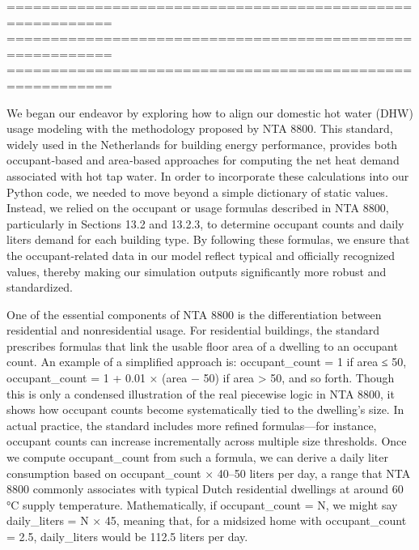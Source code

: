 ==========================================================
==========================================================
==========================================================

We began our endeavor by exploring how to align our domestic hot water (DHW) usage modeling with the methodology proposed by NTA 8800. This standard, widely used in the Netherlands for building energy performance, provides both occupant‐based and area‐based approaches for computing the net heat demand associated with hot tap water. In order to incorporate these calculations into our Python code, we needed to move beyond a simple dictionary of static values. Instead, we relied on the occupant or usage formulas described in NTA 8800, particularly in Sections 13.2 and 13.2.3, to determine occupant counts and daily liters demand for each building type. By following these formulas, we ensure that the occupant‐related data in our model reflect typical and officially recognized values, thereby making our simulation outputs significantly more robust and standardized.

One of the essential components of NTA 8800 is the differentiation between residential and nonresidential usage. For residential buildings, the standard prescribes formulas that link the usable floor area of a dwelling to an occupant count. An example of a simplified approach is: occupant_count = 1 if area ≤ 50, occupant_count = 1 + 0.01 × (area − 50) if area > 50, and so forth. Though this is only a condensed illustration of the real piecewise logic in NTA 8800, it shows how occupant counts become systematically tied to the dwelling’s size. In actual practice, the standard includes more refined formulas—for instance, occupant counts can increase incrementally across multiple size thresholds. Once we compute occupant_count from such a formula, we can derive a daily liter consumption based on occupant_count × 40–50 liters per day, a range that NTA 8800 commonly associates with typical Dutch residential dwellings at around 60 °C supply temperature. Mathematically, if occupant_count = N, we might say daily_liters = N × 45, meaning that, for a midsized home with occupant_count = 2.5, daily_liters would be 112.5 liters per day.

